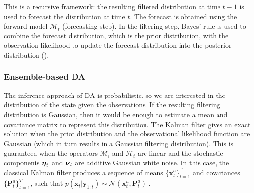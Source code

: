 \documentclass[11pt,a4paper]{article}
\renewcommand{\v}[1]{\ensuremath{\mathbf{#1}}}
\newcommand{\gv}[1]{\ensuremath{\mbox{\boldmath$ #1 $}}}
\begin{document}
This is a recursive framework: the resulting filtered distribution at time $t-1$ is used to forecast the distribution at time $t$. The forecast is obtained using the forward model $\mathcal M_t$ (forecasting step). In the filtering step, Bayes' rule is used to combine the forecast distribution, which is the prior distribution, with the observation likelihood to update the forecast distribution into the posterior distribution (\cite{Wikle2007}).

\subsubsection{Ensemble-based DA}

The inference approach of DA is probabilistic, so we are interested in the distribution of the state given the observations. If the resulting filtering distribution is Gaussian, then it would be enough to estimate a mean and covariance matrix to represent this distribution. The Kalman filter gives an exact solution when the prior distribution and the observational likelihood function are Gaussian (which in turn results in a Gaussian filtering distribution). This is guaranteed when the operators $\mathcal M_{t}$ and $\mathcal H_{t}$ are linear and the stochastic components $\gv\eta_t$ and $\gv\nu_t$ are additive Gaussian white noise.
In this case, the classical Kalman filter produces a sequence of means $\{\v x^a_t\}_{t=1}^T$ and covariances $\{\v P^a_t\}_{t=1}^T$, such that $p(\v x_t | \v y_{1:t}) \sim \mathcal{N}(\v x^a_t, \v P^a_t)$ \citep{Kalman1960}.
\end{document}
